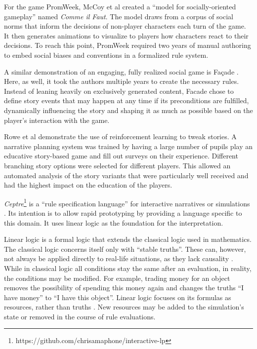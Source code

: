 For the game PromWeek, McCoy et al \cite{mccoy_2013, McCoy:2011:CIF:3014589.3014617} created a \enquote{model for socially-oriented gameplay} named \emph{Comme il Faut}.
The model draws from a corpus of social norms that inform the decisions of non-player characters each turn of the game.
It then generates animations to visualize to players how characters react to their decisions.
To reach this point, PromWeek required two years of manual authoring to embed social biases and conventions in a formalized rule system.

A similar demonstration of an engaging, fully realized social game is Fa\c{c}ade \cite{Mateas_2003}.
Here, as well, it took the authors multiple years to create the necessary rules.
Instead of leaning heavily on exclusively generated content, Facade chose to define story events that may happen at any time if its preconditions are fulfilled, dynamically influencing the story and shaping it as much as possible based on the player's interaction with the game.

Rowe et al \cite{rowe_2014} demonstrate the use of reinforcement learning to tweak stories.
A narrative planning system was trained by having a large number of pupils play an educative story-based game and fill out surveys on their experience.
Different branching story options were selected for different players.
This allowed an automated analysis of the story variants that were particularly well received and had the highest impact on the education of the players.

\emph{Ceptre}\footnote{https://github.com/chrisamaphone/interactive-lp} is a \enquote{rule specification language} for interactive narratives or simulations \cite{martens_2015}.
Its intention is to allow rapid prototyping by providing a language specific to this domain.
It uses linear logic as the foundation for the interpretation.

Linear logic is a formal logic that extends the classical logic used in mathematics.
The classical logic concerns itself only with \enquote{stable truths}.
These can, however, not always be applied directly to real-life situations, as they lack causality \cite{girard_1995}.
While in classical logic all conditions stay the same after an evaluation, in reality, the conditions may be modified.
For example, trading money for an object removes the possibility of spending this money again and changes the truths \enquote{I have money} to \enquote{I have this object}.
Linear logic focuses on its formulas as resources, rather than truths \cite{sep-logic-linear}.
New resources may be added to the simulation's state or removed in the course of rule evaluations.


